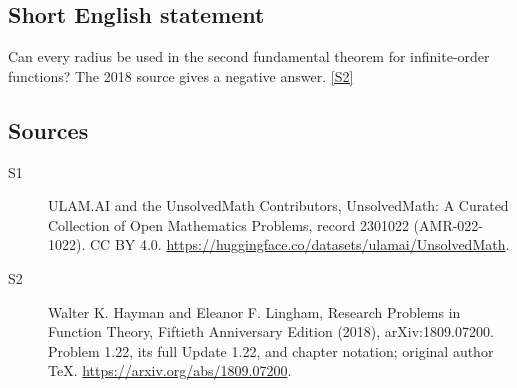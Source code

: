 \documentclass[11pt]{article}
\newcommand{\sref}[2]{\hyperlink{source:#1:#2}{[S#2]}}
\begin{document}
\subsection{Short English statement}
Can every radius be used in the second fundamental theorem for infinite-order functions? The 2018 source gives a negative answer. \sref{2301022}{2}
\subsection{Sources}
\begin{description}
\item[\hypertarget{source:2301022:1}{S1}] ULAM.AI and the UnsolvedMath Contributors, UnsolvedMath: A Curated Collection of Open Mathematics Problems, record 2301022 (AMR-022-1022). CC BY 4.0. \url{https://huggingface.co/datasets/ulamai/UnsolvedMath}.
\item[\hypertarget{source:2301022:2}{S2}] Walter K. Hayman and Eleanor F. Lingham, Research Problems in Function Theory, Fiftieth Anniversary Edition (2018), arXiv:1809.07200. Problem 1.22, its full Update 1.22, and chapter notation; original author TeX. \url{https://arxiv.org/abs/1809.07200}.
\end{description}
\label{end:2301022}
\end{document}
